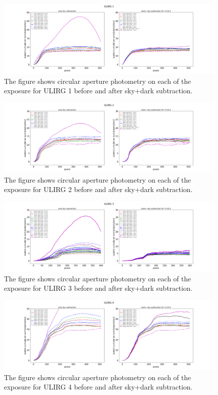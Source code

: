 \documentclass[11pt]{article}
\begin{document}
\begin{figure}
 \includegraphics[scale=0.30]{gal1_photometry_FLT_subtracted_final.png}

\caption{The figure shows circular aperture photometry on each of the exposure for ULIRG 1 before and after sky+dark subtraction. \label{fig:gal1}
 }
\end{figure}
\begin{figure}
 \includegraphics[scale=0.30]{gal2_photometry_FLT_subtracted_final.png}

\caption{The figure shows circular aperture photometry on each of the exposure for ULIRG 2 before and after sky+dark subtraction. \label{fig:gal2}
 }
\end{figure}
\begin{figure}
 \includegraphics[scale=0.30]{gal3_photometry_FLT_subtracted_final.png}

\caption{The figure shows circular aperture photometry on each of the exposure for ULIRG 3 before and after sky+dark subtraction. \label{fig:gal3}
 }
\end{figure}
\begin{figure}
 \includegraphics[scale=0.30]{gal4_photometry_FLT_subtracted_final.png}

\caption{The figure shows circular aperture photometry on each of the exposure for ULIRG 4 before and after sky+dark subtraction. \label{fig:gal4}
 }
\end{figure}
\end{document}
